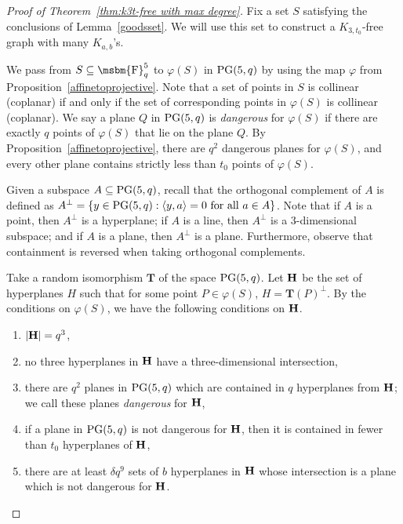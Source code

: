 \documentclass[12pt]{article}
\newcommand{\FF}{\mbox{\msbm{F}}}
\begin{document}
\begin{proof}[Proof of Theorem~\ref{thm:k3t-free with max degree}]

Fix a set $S$ satisfying the conclusions of Lemma~\ref{goodsset}. We will use this set to construct a $K_{3, t_0}$-free graph with many $K_{a, b}$'s. 

We pass from $S \subseteq \FF_q^5$ to $\varphi(S)$ in ${\rm{PG}}(5, q)$ by using the map $\varphi$ from Proposition~\ref{affinetoprojective}.  Note that a set of points in $S$ is collinear (coplanar) if and only if the set of corresponding points in $\varphi(S)$ is collinear (coplanar). We say a plane $Q$ in $ {\rm{PG}}(5, q)$ is \emph{dangerous} for $\varphi(S)$ if there are exactly $q$ points of $\varphi(S)$ that lie on the plane $Q$. By Proposition~\ref{affinetoprojective}, there are $q^2$ dangerous planes for $\varphi(S)$, and every other plane contains strictly less than $t_0$ points of $\varphi(S)$. 


Given a subspace $A \subseteq {\rm{PG}}(5, q)$, recall that the orthogonal complement of $A$ is defined as $A^\perp = \{y\in {\rm{PG}}(5,q) : \langle y, a \rangle = 0 \text{ for all } a \in A\}$. Note that if $A$ is a point, then $A^\perp$ is a hyperplane; if $A$ is a line, then $A^{\perp}$ is a $3$-dimensional subspace; and if $A$ is a plane, then $A^{\perp}$ is a plane. Furthermore, observe that containment is reversed when taking orthogonal complements.

Take a random isomorphism $\textbf{T}$ of the space ${\rm{PG}}(5, q)$. Let $\bold{H}$ be the set of hyperplanes $H$ such that for some point $P \in \varphi(S)$, $H = \textbf{T}(P)^{\perp}$. By the conditions on $\varphi(S)$, we have the following conditions on $\bold{H}$.
\begin{enumerate}
    \item $|\bold{H}|=q^3$,
    \item no three hyperplanes in $\bold{H}$ have a three-dimensional intersection,
    \item there are $q^2$ planes in ${\rm{PG}}(5,q)$ which are contained in $q$ hyperplanes from $\bold{H}$; we call these planes \emph{dangerous} for $\bold{H}$, 
    \item if a plane in ${\rm{PG}}(5,q)$ is not dangerous for $\bold{H}$, then it is contained in fewer than $t_0$ hyperplanes of $\bold{H}$, 
    \item there are at least $\delta q^9$ sets of $b$ hyperplanes in $\bold{H}$ whose intersection is a plane which is not dangerous for $\bold{H}$.
\end{enumerate}  


\end{proof}
\end{document}
